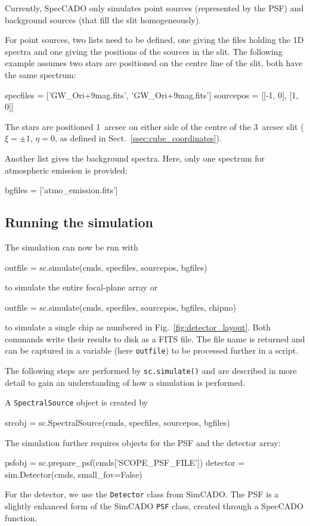 \documentclass[a4paper,twoside,11pt]{article}
\begin{document}
Currently, SpecCADO only simulates point sources (represented by the
PSF) and background sources (that fill the slit homogeneously).

For point sources, two lists need to be defined, one giving the files
holding the 1D spectra and one giving the positions of the sources in
the slit. The following example assumes two stars are positioned on
the centre line of the slit, both have the same spectrum:
\begin{pyin}
specfiles = ['GW_Ori+9mag.fits', 'GW_Ori+9mag.fits']
sourcepos = [[-1, 0], [1, 0]]
\end{pyin}
The stars are positioned 1~arcsec on either side of the centre of the
3~arcsec slit ($\xi=\pm 1$, $\eta=0$, as defined in
Sect.~\ref{ssec:cube_coordinates}).

Another list gives the background spectra. Here, only one spectrum for
atmospheric emission is provided:
\begin{pyin}
bgfiles = ['atmo_emission.fits']
\end{pyin}

\subsection{Running the simulation}
\label{ssec:simulation_run}

The simulation can now be run with
\begin{pyin}
outfile = sc.simulate(cmds, specfiles, sourcepos, bgfiles)
\end{pyin}
to simulate the entire focal-plane array or
\begin{pyin}
outfile = sc.simulate(cmds, specfiles, sourcepos, bgfiles, chipno)
\end{pyin}
to simulate a single chip as numbered in
Fig.~\ref{fig:detector_layout}. Both commands write their results to
disk as a FITS file. The file name is returned and can be captured in a
variable (here \lstinline{outfile}) to be processed further in a
script.

The following steps are performed by \lstinline{sc.simulate()} and are
described in more detail to gain an understanding of how a simulation
is performed.

A \lstinline{SpectralSource} object is created by
\begin{pyin}
srcobj = sc.SpectralSource(cmds, specfiles, sourcepos, bgfiles)
\end{pyin}

The simulation further requires objects for the PSF and the detector
array:
\begin{pyin}
psfobj = sc.prepare_psf(cmds['SCOPE_PSF_FILE'])
detector = sim.Detector(cmds, small_fov=False)
\end{pyin}
For the detector, we use the \lstinline{Detector} class from
SimCADO. The PSF is a slightly enhanced form of the SimCADO
\lstinline{PSF} class, created through a SpecCADO function.
\end{document}
